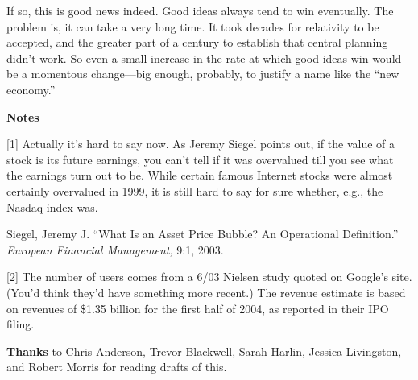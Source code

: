 If so, this is good news indeed. Good ideas always tend to win
eventually. The problem is, it can take a very long time. It took
decades for relativity to be accepted, and the greater part of a century
to establish that central planning didn't work. So even a small increase
in the rate at which good ideas win would be a momentous change---big
enough, probably, to justify a name like the ``new economy.''

\textbf{Notes}

{[}1{]} Actually it's hard to say now. As Jeremy Siegel points out, if
the value of a stock is its future earnings, you can't tell if it was
overvalued till you see what the earnings turn out to be. While certain
famous Internet stocks were almost certainly overvalued in 1999, it is
still hard to say for sure whether, e.g., the Nasdaq index was.

Siegel, Jeremy J. ``What Is an Asset Price Bubble? An Operational
Definition.'' \emph{European Financial Management,} 9:1, 2003.

{[}2{]} The number of users comes from a 6/03 Nielsen study quoted on
Google's site. (You'd think they'd have something more recent.) The
revenue estimate is based on revenues of \$1.35 billion for the first
half of 2004, as reported in their IPO filing.

\textbf{Thanks} to Chris Anderson, Trevor Blackwell, Sarah Harlin,
Jessica Livingston, and Robert Morris for reading drafts of this.
